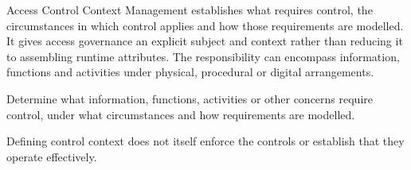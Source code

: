 Access Control Context Management establishes what requires control, the circumstances in which control applies and how those requirements are modelled. It gives access governance an explicit subject and context rather than reducing it to assembling runtime attributes. The responsibility can encompass information, functions and activities under physical, procedural or digital arrangements.



Determine what information, functions, activities or other concerns require control, under what circumstances and how requirements are modelled.



Defining control context does not itself enforce the controls or establish that they operate effectively.


